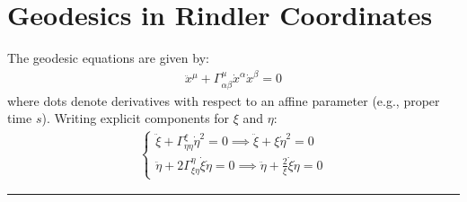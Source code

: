\documentclass[letterpaper,10pt,english]{jupyterBook}
\begin{document}
\section{Geodesics in Rindler Coordinates}
\label{\detokenize{ch/relativity-special/rindler:geodesics-in-rindler-coordinates}}
\sphinxAtStartPar
The geodesic equations are given by:
\begin{equation*}
\begin{split}\ddot{x}^\mu + \Gamma^\mu_{\alpha\beta} \dot{x}^\alpha \dot{x}^\beta = 0\end{split}
\end{equation*}
\sphinxAtStartPar
where dots denote derivatives with respect to an affine parameter (e.g., proper time \(s\)).
Writing explicit components for \(\xi\) and \(\eta\):
\begin{equation*}
\begin{split}\begin{cases} \ddot{\xi} + \Gamma^{\xi}_{\eta\eta} \dot{\eta}^2 = 0 \implies \ddot{\xi} + \xi \dot{\eta}^2 = 0 \\ \ddot{\eta} + 2 \Gamma^\eta_{\xi\eta} \dot{\xi}\dot{\eta} = 0 \implies \ddot{\eta} + \frac{2}{\xi} \dot{\xi}\dot{\eta} = 0 \end{cases}\end{split}
\end{equation*}

\bigskip\hrule\bigskip
\end{document}
